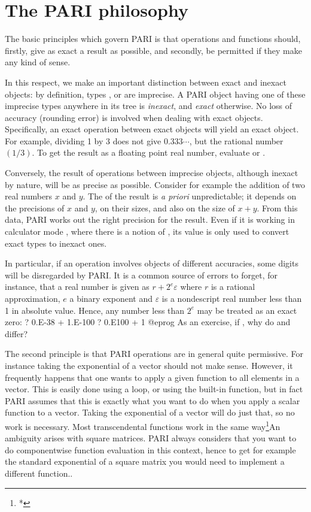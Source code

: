 \section{The PARI philosophy}
The basic principles which govern PARI is that operations and functions
should, firstly, give as exact a result as possible, and secondly, be
permitted if they make any kind of sense.

In this respect, we make an important distinction between exact and inexact
objects: by definition, types ,  or  are
imprecise. A PARI object having one of these imprecise types anywhere in
its tree is \emph{inexact}, and \emph{exact} otherwise. No loss of accuracy
(rounding error) is involved when dealing with exact objects. Specifically,
an exact operation between exact objects will yield an exact object. For
example, dividing 1 by 3 does not give $0.333\cdots$, but the rational number
$(1/3)$. To get the result as a floating point real number, evaluate
 or .

Conversely, the result of operations between imprecise objects, although
inexact by nature, will be as precise as possible. Consider for example the
addition of two real numbers $x$ and $y$. The  of the result is
\emph{a priori} unpredictable; it depends on the precisions of $x$ and $y$,
on their sizes, and also on the size of $x+y$. From this data, PARI works out
the right precision for the result. Even if it is working in calculator mode
, where there is a notion of , its value is
only used to convert exact types to inexact ones.

In particular, if an operation involves objects of different accuracies, some
digits will be disregarded by PARI. It is a common source of errors to
forget, for instance, that a real number is given as $r + 2^e \varepsilon$
where $r$ is a rational approximation, $e$ a binary exponent and
$\varepsilon$ is a nondescript real number less than 1 in absolute value.
Hence, any number less than $2^e$ may be treated as an exact zero:
\bprog
? 0.E-38 + 1.E-100
? 0.E100 + 1
@eprog
\noindent As an exercise, if , why do  and
 differ?

The second principle is that PARI operations are in general quite permissive.
For instance taking the exponential of a vector should not make sense.
However, it frequently happens that one wants to apply a given function
to all elements in a vector. This is easily done using a loop,
or using the  built-in function, but in fact PARI assumes that
this is exactly what you want to do when you apply a scalar function to a
vector. Taking the exponential of a vector will do just that, so no work is
necessary. Most transcendental functions work in the same way\footnote{*}{An
ambiguity arises with square matrices. PARI always considers that you want to
do componentwise function evaluation in this context, hence to get for
example the standard exponential of a square matrix you would need to
implement a different function.}.

